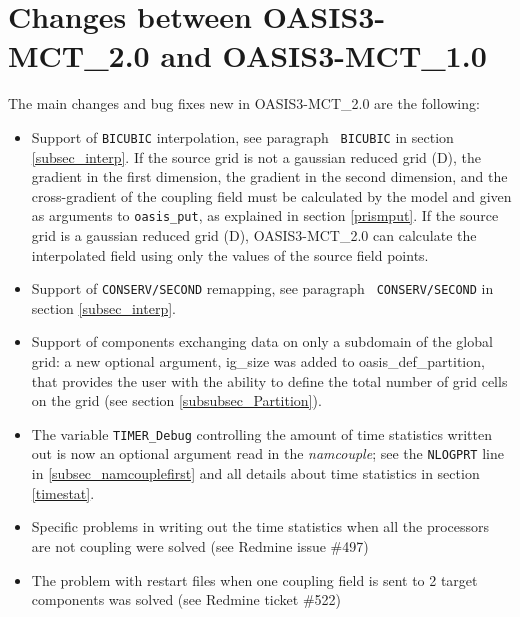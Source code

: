\section{Changes between OASIS3-MCT\_2.0 and OASIS3-MCT\_1.0}
\label{sec_oa1_oa2}

The main changes and bug fixes new in OASIS3-MCT\_2.0 are the
following:
\begin{itemize}

\item Support of {\tt BICUBIC} interpolation, see paragraph {\tt
    BICUBIC} in section \ref{subsec_interp}. If the source grid
    is not a gaussian reduced grid (D), the gradient in the first dimension,
    the gradient in the second dimension, and the cross-gradient
    of the coupling field must be calculated by the model and
    given as arguments to {\tt oasis\_put}, as explained in section \ref{prismput}.
    If the source grid is a gaussian reduced grid (D), OASIS3-MCT\_2.0
    can calculate the interpolated field using only the values of the source
    field points.

\item Support of {\tt CONSERV/SECOND} remapping, see paragraph {\tt
    CONSERV/SECOND} in section \ref{subsec_interp}.

\item Support of components exchanging data on only a subdomain of the
  global grid: a new optional argument, ig\_size was added to
  oasis\_def\_partition, that provides the user with the ability to
  define the total number of grid cells on the grid (see section
  \ref{subsubsec_Partition}).


\item The variable {\tt TIMER\_Debug} controlling the amount of time
  statistics written out is now an optional argument read in the {\it
    namcouple}; see the {\tt NLOGPRT} line in
  \ref{subsec_namcouplefirst} and all details about time statistics in
  section \ref{timestat}.

\item Specific problems in writing out the time statistics when all
  the processors are not coupling were solved (see Redmine issue
  \#497)

\item The problem with restart files when one coupling field is sent
  to 2 target components was solved (see Redmine ticket \#522)


\end{itemize}
